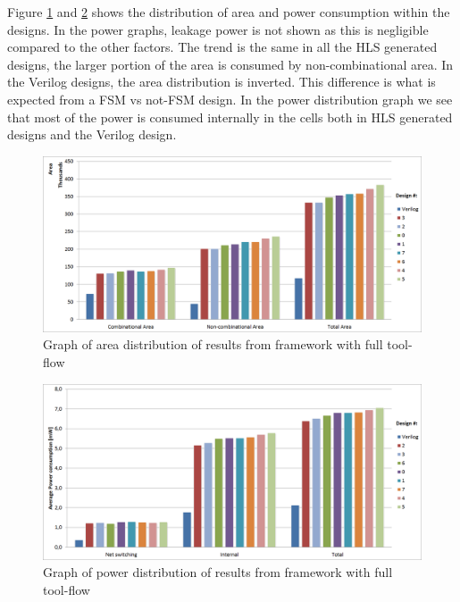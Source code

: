 Figure \ref{fig:resultgraphareaframeworkrun2} and \cref{fig:resultgraphpowerframeworkrun2} shows the distribution of area and power consumption within the designs. In the power graphs, leakage power is not shown as this is negligible compared to the other factors. The trend is the same in all the HLS generated designs, the larger portion of the area is consumed by non-combinational area. In the Verilog designs, the area distribution is inverted. This difference is what is expected from a FSM vs not-FSM design. In the power distribution graph we see that most of the power is consumed internally in the cells both in HLS generated designs and the Verilog design.

\begin{figure}[hbpt]
\centering
\includegraphics[width=\textwidth]{../figs/resultGraphAreaDistribution.png}
\caption{\label{fig:resultgraphareaframeworkrun2}Graph of area distribution of results from framework with full tool-flow}
\end{figure}

\begin{figure}[hbpt]
\centering
\includegraphics[width=\textwidth]{../figs/resultGraphPowerDistribution.png}
\caption{\label{fig:resultgraphpowerframeworkrun2}Graph of power distribution of results from framework with full tool-flow}
\end{figure}


